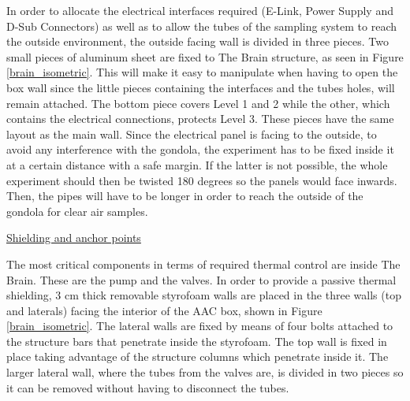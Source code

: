 \smallskip
In order to allocate the electrical interfaces required (E-Link, Power Supply and D-Sub Connectors) as well as to allow the tubes of the sampling system to reach the outside environment, the outside facing wall is divided in three pieces. Two small pieces of aluminum sheet are fixed to The Brain structure, as seen in Figure \ref{brain_isometric}. This will make it easy to manipulate when having to open the box wall since the little pieces containing the interfaces and the tubes holes, will remain attached. The bottom piece covers Level 1 and 2 while the other, which contains the electrical connections, protects Level 3. These pieces have the same layout as the main wall. 
Since the electrical panel is facing to the outside, to avoid any interference with the gondola, the experiment has to be fixed inside it at a certain distance with a safe margin. If the latter is not possible, the whole experiment should then be twisted 180 degrees so the panels would face inwards. Then, the pipes will have to be longer in order to reach the outside of the gondola for clear air samples. 











\bigskip
\underline{Shielding and anchor points}

\smallskip
The most critical components in terms of required thermal control are inside The Brain. These are the pump and the valves. In order to provide a passive thermal shielding, 3 cm thick removable styrofoam walls are placed in the three walls (top and laterals) facing the interior of the AAC box, shown in Figure \ref{brain_isometric}. The lateral walls are fixed by means of four bolts attached to the structure bars that penetrate inside the styrofoam. The top wall is fixed in place taking advantage of the structure columns which penetrate inside it. The larger lateral wall, where the tubes from the valves are, is divided in two pieces so it can be removed without having to disconnect the tubes. 

